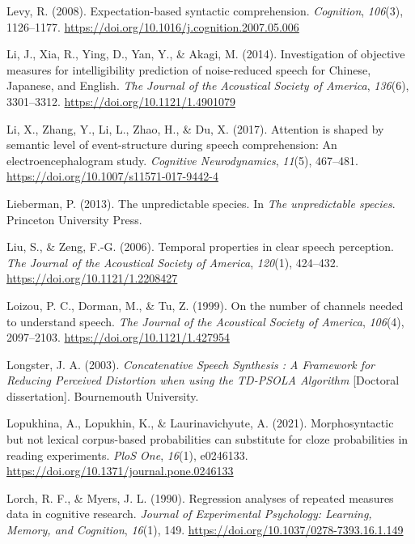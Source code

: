 \documentclass[a4paper, nobind]{templates/ociamthesis}
\newlength{\cslhangindent}
\newenvironment{CSLReferences}[2] %
 {%
  \setlength{\parindent}{0pt}
  \ifodd #1
  \let\oldpar\par
  \def\par{\hangindent=\cslhangindent\oldpar}
  \fi
  \setlength{\parskip}{1mm}
  \setlength{\baselineskip}{6mm}
 }%
 {}
\begin{document}
\begin{CSLReferences}{1}{0}
\leavevmode{}%
Levy, R. (2008). Expectation-based syntactic comprehension. \emph{Cognition}, \emph{106}(3), 1126--1177. \url{https://doi.org/10.1016/j.cognition.2007.05.006}

\leavevmode{}%
Li, J., Xia, R., Ying, D., Yan, Y., \& Akagi, M. (2014). {Investigation of objective measures for intelligibility prediction of noise-reduced speech for Chinese, Japanese, and English}. \emph{The Journal of the Acoustical Society of America}, \emph{136}(6), 3301--3312. \url{https://doi.org/10.1121/1.4901079}

\leavevmode{}%
Li, X., Zhang, Y., Li, L., Zhao, H., \& Du, X. (2017). {Attention is shaped by semantic level of event-structure during speech comprehension: An electroencephalogram study}. \emph{Cognitive Neurodynamics}, \emph{11}(5), 467--481. \url{https://doi.org/10.1007/s11571-017-9442-4}

\leavevmode{}%
Lieberman, P. (2013). The unpredictable species. In \emph{The unpredictable species}. Princeton University Press.

\leavevmode{}%
Liu, S., \& Zeng, F.-G. (2006). {Temporal properties in clear speech perception}. \emph{The Journal of the Acoustical Society of America}, \emph{120}(1), 424--432. \url{https://doi.org/10.1121/1.2208427}

\leavevmode{}%
Loizou, P. C., Dorman, M., \& Tu, Z. (1999). On the number of channels needed to understand speech. \emph{The Journal of the Acoustical Society of America}, \emph{106}(4), 2097--2103. \url{https://doi.org/10.1121/1.427954}

\leavevmode{}%
Longster, J. A. (2003). \emph{{Concatenative Speech Synthesis : A Framework for Reducing Perceived Distortion when using the TD-PSOLA Algorithm}} {[}Doctoral dissertation{]}. Bournemouth University.

\leavevmode{}%
Lopukhina, A., Lopukhin, K., \& Laurinavichyute, A. (2021). Morphosyntactic but not lexical corpus-based probabilities can substitute for cloze probabilities in reading experiments. \emph{PloS One}, \emph{16}(1), e0246133. \url{https://doi.org/10.1371/journal.pone.0246133}

\leavevmode{}%
Lorch, R. F., \& Myers, J. L. (1990). Regression analyses of repeated measures data in cognitive research. \emph{Journal of Experimental Psychology: Learning, Memory, and Cognition}, \emph{16}(1), 149. \url{https://doi.org/10.1037/0278-7393.16.1.149}


\end{CSLReferences}
\end{document}
